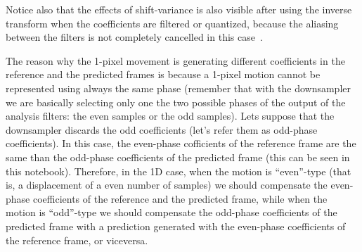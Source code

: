 Notice also that the effects of shift-variance is also visible
after using the inverse transform when the coefficients are filtered
or quantized, because the aliasing between the filters is not
completely cancelled in this case~\cite{bradley2003shift}.

The reason why the 1-pixel movement is generating different
coefficients in the reference and the predicted frames is because a
1-pixel motion cannot be represented using always the same phase
(remember that with the downsampler we are basically selecting only
one the two possible phases of the output of the analysis filters: the
even samples or the odd samples). Lets suppose that the downsampler
discards the odd coefficients (let's refer them as odd-phase
coefficients). In this case, the even-phase cofficients of the
reference frame are the same than the odd-phase coefficients of the
predicted frame (this can be seen in this notebook). Therefore, in the
1D case, when the motion is ``even''-type (that is, a displacement of
a even number of samples) we should compensate the even-phase
coefficients of the reference and the predicted frame, while when the
motion is ``odd''-type we should compensate the odd-phase coefficients
of the predicted frame with a prediction generated with the even-phase
coefficients of the reference frame, or viceversa.

